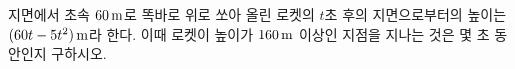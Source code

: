 지면에서 초속 $60\mkern3mu \mathrm{m}$로 똑바로 위로 쏘아 올린 로켓의 $t$초 후의 지면으로부터의 높이는 $(60t-5t^2)\mkern3mu \mathrm{m}$라 한다. 이때 로켓이 높이가 $160\mkern3mu \mathrm{m}$ 이상인 지점을 지나는 것은 몇 초 동안인지 구하시오.
